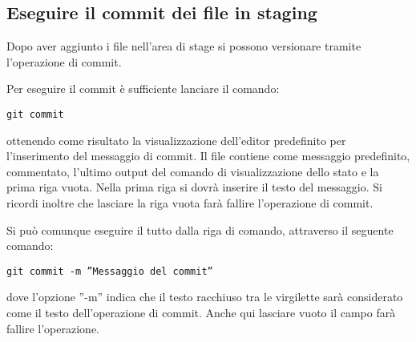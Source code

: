 \subsection{Eseguire il commit dei file in staging}
Dopo aver aggiunto i file nell'area di stage si possono versionare tramite l'operazione di commit.

Per eseguire il commit è sufficiente lanciare il comando:

\begin{center}
\texttt{git commit}
\end{center}

ottenendo come risultato la visualizzazione dell'editor predefinito per l'inserimento del messaggio di commit. Il file contiene come messaggio predefinito, commentato, l'ultimo output del comando di visualizzazione dello stato e la prima riga vuota. Nella prima riga si dovrà inserire il testo del messaggio. Si ricordi inoltre che lasciare la riga vuota farà fallire l'operazione di commit.

Si può comunque eseguire il tutto dalla riga di comando, attraverso il seguente comando:

\begin{center}
\texttt{git commit -m ''Messaggio del commit''}
\end{center}

dove l'opzione ''-m'' indica che il testo racchiuso tra le virgilette sarà considerato come il testo dell'operazione di commit. Anche qui lasciare vuoto il campo farà fallire l'operazione.